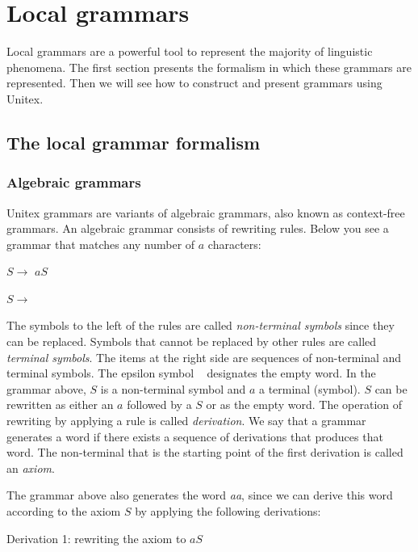 \chapter{Local grammars}
\label{chap-grammars}

Local grammars are a powerful tool to represent the majority of linguistic
phenomena. The first section presents the formalism in which these grammars are
represented. Then we will see how to construct and present grammars using Unitex.

\section{The local grammar formalism}

\subsection{Algebraic grammars}
Unitex grammars are variants of algebraic grammars, also known as context-free
grammars.  An algebraic grammar consists of
rewriting rules. Below you see a grammar that matches any number of $a$
characters:

\bigskip $S \rightarrow$ $aS$

$S \rightarrow$ \E

\bigskip
\noindent The symbols to the left of the rules are called \textit{non-terminal
symbols}  since they can
be replaced. Symbols that cannot be replaced by other rules are called
\textit{terminal symbols}. The items at the right side
are sequences of non-terminal and terminal symbols. The epsilon symbol \E ~
designates the empty word. In the grammar above, $S$ is a non-terminal symbol and
$a$ a terminal (symbol). $S$ can be rewritten as either an $a$ followed by a $S$
or as the empty word. The operation of rewriting by applying a rule is called
\textit{derivation}. We say that a grammar generates a word if
there exists a sequence of derivations that produces that word. The non-terminal
that is the starting point of the first derivation is called an
\textit{axiom}.


\bigskip
\noindent The grammar above also generates the word \textit{aa}, since we can
derive this word according to the axiom $S$ by applying the following derivations:

\bigskip Derivation 1: rewriting the axiom to $aS$

